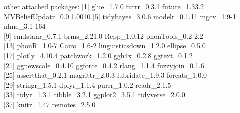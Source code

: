 \documentclass[preprint]{JASA}
\begin{document}
other attached packages:
{[}1{]} glue\_1.7.0 furrr\_0.3.1 future\_1.33.2 MVBeliefUpdatr\_0.0.1.0010
{[}5{]} tidybayes\_3.0.6 modelr\_0.1.11 mgcv\_1.9-1 nlme\_3.1-164\\
{[}9{]} cmdstanr\_0.7.1 brms\_2.21.0 Rcpp\_1.0.12 phonTools\_0.2-2.2\\
{[}13{]} phonR\_1.0-7 Cairo\_1.6-2 linguisticsdown\_1.2.0 ellipse\_0.5.0\\
{[}17{]} plotly\_4.10.4 patchwork\_1.2.0 ggh4x\_0.2.8 ggtext\_0.1.2\\
{[}21{]} ggnewscale\_0.4.10 ggforce\_0.4.2 rlang\_1.1.4 fuzzyjoin\_0.1.6\\
{[}25{]} assertthat\_0.2.1 magrittr\_2.0.3 lubridate\_1.9.3 forcats\_1.0.0\\
{[}29{]} stringr\_1.5.1 dplyr\_1.1.4 purrr\_1.0.2 readr\_2.1.5\\
{[}33{]} tidyr\_1.3.1 tibble\_3.2.1 ggplot2\_3.5.1 tidyverse\_2.0.0\\
{[}37{]} knitr\_1.47 remotes\_2.5.0
\end{document}
